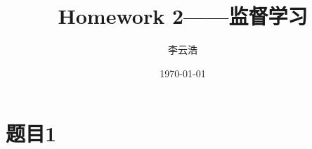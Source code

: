 \documentclass{article}
\title{Homework 2——监督学习}
\author{李云浩}
\date{\today}
\begin{document}
\maketitle
\section{题目1}
\end{document}
